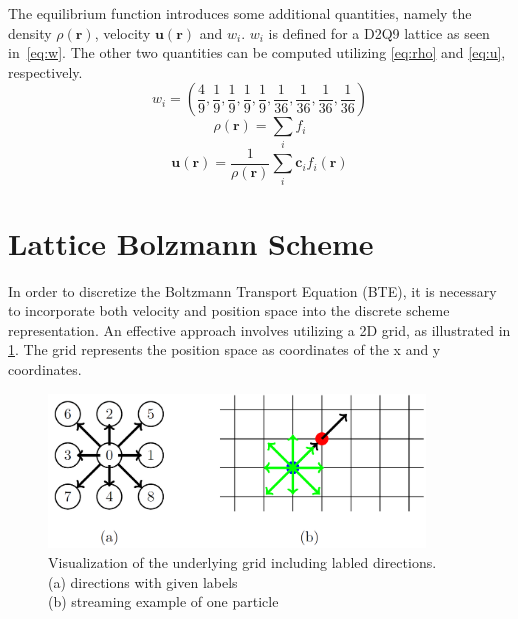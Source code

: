 The equilibrium function introduces some additional quantities, namely the density \(\rho(\mathbf{r})\), velocity \(\mathbf{u}(\mathbf{r})\) and \(w_i\).
\(w_i\) is defined for a D2Q9 lattice as seen in~\cref{eq:w}.
The other two quantities can be computed utilizing \cref{eq:rho} and \cref{eq:u}, respectively.
\begin{equation}
    w_i = \left(\dfrac{4}{9},
    \dfrac{1}{9}, \dfrac{1}{9}, \dfrac{1}{9}, \dfrac{1}{9},
    \dfrac{1}{36}, \dfrac{1}{36}, \dfrac{1}{36}, \dfrac{1}{36}\right)
    \label{eq:w}
\end{equation}
\begin{equation}
    \rho(\mathbf{r})=\sum_i f_i
    \label{eq:rho}
\end{equation}
\begin{equation}
    \mathbf{u}(\mathbf{r})=
    \frac{1}{\rho(\mathbf{r})}\sum_i \mathbf{c}_i f_i(\mathbf{r})
    \label{eq:u}
\end{equation}


\section{Lattice Bolzmann Scheme}\label{sec:lattice-bolzmann-scheme}

In order to discretize the Boltzmann Transport Equation (BTE), it is necessary to incorporate both velocity and position space into the discrete scheme representation.
An effective approach involves utilizing a 2D grid, as illustrated in \cref{fig:bte-scheme}.
The grid represents the position space as coordinates of the x and y coordinates.

\begin{figure}[H]
    \begin{center}
        \includegraphics[width=10cm]{logos/Gitter_LBM.png}
        \caption[Visualization of the underlying grid including labled directions.]{
            Visualization of the underlying grid including labled directions. \\
            (a) directions with given labels \\
            (b) streaming example of one particle
        }
        \label{fig:bte-scheme}
    \end{center}
\end{figure}

